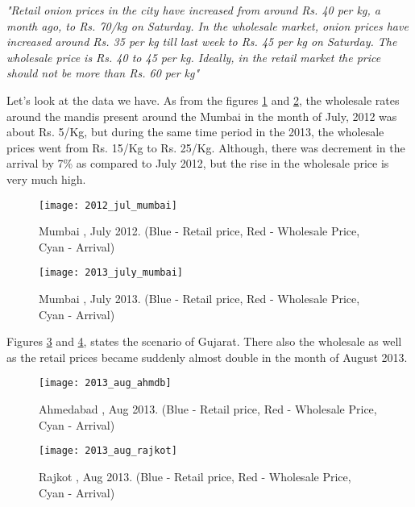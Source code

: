 \textit{"Retail onion prices in the city have increased from around Rs. 40 per kg, a month ago, to Rs. 70/kg on Saturday. In the wholesale market, onion prices have increased around Rs. 35 per kg till last week to Rs. 45 per kg on Saturday. The wholesale price is Rs. 40 to 45 per kg. Ideally, in the retail market the price should not be more than Rs. 60 per kg"}

Let's look at the data we have. As from the figures \ref{fig:MumbaiJuly2012} and \ref{fig:MumbaiJuly2013}, the wholesale rates around the mandis present around the Mumbai in the month of July, 2012 was about Rs. 5/Kg, but during the same time period in the 2013, the wholesale prices went from Rs. 15/Kg to Rs. 25/Kg. Although, there was decrement in the arrival by 7\% as compared to July 2012, but the rise in the wholesale price is very much high.\\

\begin{figure}[h]
\begin{center}    
\texttt{[image: 2012\_jul\_mumbai]}
\caption{Mumbai , July 2012. (Blue - Retail price, Red - Wholesale Price, Cyan - Arrival)}
\label{fig:MumbaiJuly2012}
\end{center}
\end{figure}

\begin{figure}[h]
\begin{center}    
\texttt{[image: 2013\_july\_mumbai]}
\caption{Mumbai , July 2013. (Blue - Retail price, Red - Wholesale Price, Cyan - Arrival)}
\label{fig:MumbaiJuly2013}
\end{center}
\end{figure}


Figures \ref{fig:AhmedabadAug2013} and \ref{fig:RajkotAug2013}, states the scenario of Gujarat. There also the wholesale as well as the retail prices became suddenly almost double in the month of August 2013. \\

\begin{figure}[h]
\begin{center}    
\texttt{[image: 2013\_aug\_ahmdb]}
\caption{Ahmedabad , Aug 2013. (Blue - Retail price, Red - Wholesale Price, Cyan - Arrival)}
\label{fig:AhmedabadAug2013}
\end{center}
\end{figure}

\begin{figure}[h]
\begin{center}    
\texttt{[image: 2013\_aug\_rajkot]}
\caption{Rajkot , Aug 2013. (Blue - Retail price, Red - Wholesale Price, Cyan - Arrival)}
\label{fig:RajkotAug2013}
\end{center}
\end{figure}

